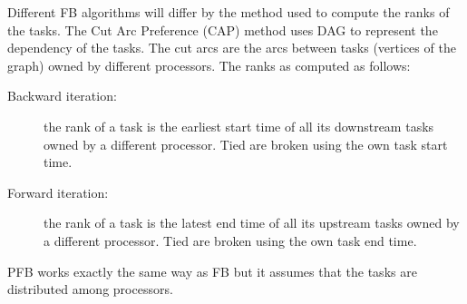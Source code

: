 \documentclass[letterpaper]{article}
\renewcommand{\(}{\left(}
\renewcommand{\)}{\right)}
\renewcommand{\[}{\left[}
\renewcommand{\]}{\right]}
\begin{document}
Different FB algorithms will differ by the method used to compute the ranks of the tasks. The
Cut Arc Preference (CAP) method uses DAG to represent the dependency of the
tasks. The cut arcs are the arcs between tasks (vertices of the
graph) owned by different processors. The ranks as computed as follows:
\begin{description}
  \item[Backward iteration:] the rank of a task is the earliest start time of all its downstream tasks
    owned by a different processor. Tied are broken using the own task start time.
  \item[Forward iteration:] the rank of a task is the latest end time of all its upstream tasks owned
    by a different processor. Tied are broken using the own task end time.
\end{description}
PFB works exactly the same way as FB but it assumes that the tasks are
distributed among processors.
\end{document}
